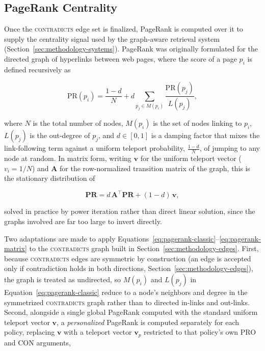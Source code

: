 \subsection{PageRank Centrality}
\label{sec:methodology-pagerank}

Once the \textsc{contradicts} edge set is finalized, PageRank \cite{page1999pagerank} is computed
over it to supply the centrality signal used by the graph-aware retrieval system
(Section~\ref{sec:methodology-systems}). PageRank was originally formulated for the directed graph
of hyperlinks between web pages, where the score of a page $p_i$ is defined recursively as

\begin{equation}
\mathrm{PR}(p_i) = \frac{1-d}{N} + d \sum_{p_j \in M(p_i)} \frac{\mathrm{PR}(p_j)}{L(p_j)},
\label{eq:pagerank-classic}
\end{equation}

\noindent where $N$ is the total number of nodes, $M(p_i)$ is the set of nodes linking to $p_i$,
$L(p_j)$ is the out-degree of $p_j$, and $d \in [0,1]$ is a damping factor that mixes the
link-following term against a uniform teleport probability, $\frac{1-d}{N}$, of jumping to any
node at random. In matrix form, writing $\mathbf{v}$ for the uniform teleport vector
($v_i = 1/N$) and $\mathbf{A}$ for the row-normalized transition matrix of the graph, this is the
stationary distribution of

\begin{equation}
\mathbf{PR} = d \, \mathbf{A}^\top \mathbf{PR} + (1-d)\, \mathbf{v},
\label{eq:pagerank-matrix}
\end{equation}

\noindent solved in practice by power iteration rather than direct linear solution, since the
graphs involved are far too large to invert directly.

Two adaptations are made to apply Equations~\ref{eq:pagerank-classic}--\ref{eq:pagerank-matrix} to
the \textsc{contradicts} graph built in Section~\ref{sec:methodology-edges}. First, because
\textsc{contradicts} edges are symmetric by construction (an edge is accepted only if contradiction
holds in both directions, Section~\ref{sec:methodology-edges}), the graph is treated as undirected,
so $M(p_i)$ and $L(p_j)$ in Equation~\ref{eq:pagerank-classic} reduce to a node's neighbors and
degree in the symmetrized \textsc{contradicts} graph rather than to directed in-links and
out-links. Second, alongside a single global PageRank computed with the standard uniform teleport
vector $\mathbf{v}$, a \emph{personalized} PageRank is computed separately for each policy,
replacing $\mathbf{v}$ with a teleport vector $\mathbf{v}_p$ restricted to that policy's own PRO
and CON arguments,

